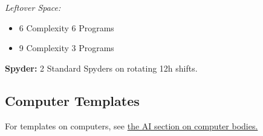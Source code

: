 \begin{multicols*}{3}
	\textit{Leftover Space:}
	\begin{itemize}
		\itemsep 0pt
		\item 6 Complexity 6 Programs
		\item 9 Complexity 3 Programs
	\end{itemize}
	
	\textbf{Spyder:}
	2 Standard Spyders on rotating 12h shifts.
	
	
	\subsection*{Computer Templates}
	
	For templates on computers, see \hyperref[ai_computer]{the AI section on computer bodies.}
	
\end{multicols*}